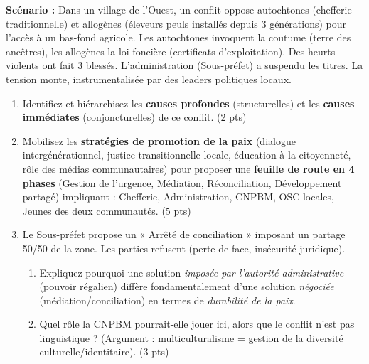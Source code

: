 \documentclass[11pt]{article}
\begin{document}
\begin{exercice}
\textbf{Scénario :} Dans un village de l'Ouest, un conflit oppose autochtones (chefferie traditionnelle) et allogènes (éleveurs peuls installés depuis 3 générations) pour l'accès à un bas-fond agricole. Les autochtones invoquent la coutume (terre des ancêtres), les allogènes la loi foncière (certificats d'exploitation). Des heurts violents ont fait 3 blessés. L'administration (Sous-préfet) a suspendu les titres. La tension monte, instrumentalisée par des leaders politiques locaux.

\begin{enumerate}
    \item Identifiez et hiérarchisez les \textbf{causes profondes} (structurelles) et les \textbf{causes immédiates} (conjoncturelles) de ce conflit. (2 pts)
    \item Mobilisez les \textbf{stratégies de promotion de la paix} (dialogue intergénérationnel, justice transitionnelle locale, éducation à la citoyenneté, rôle des médias communautaires) pour proposer une \textbf{feuille de route en 4 phases} (Gestion de l'urgence, Médiation, Réconciliation, Développement partagé) impliquant : Chefferie, Administration, CNPBM, OSC locales, Jeunes des deux communautés. (5 pts)
    \item Le Sous-préfet propose un « Arrêté de conciliation » imposant un partage 50/50 de la zone. Les parties refusent (perte de face, insécurité juridique). 
    \begin{enumerate}
        \item Expliquez pourquoi une solution \textit{imposée par l'autorité administrative} (pouvoir régalien) diffère fondamentalement d'une solution \textit{négociée} (médiation/conciliation) en termes de \textit{durabilité de la paix}. 
        \item Quel rôle la CNPBM pourrait-elle jouer ici, alors que le conflit n'est pas linguistique ? (Argument : multiculturalisme = gestion de la diversité culturelle/identitaire). (3 pts)
    \end{enumerate}
\end{enumerate}
\end{exercice}
\end{document}
